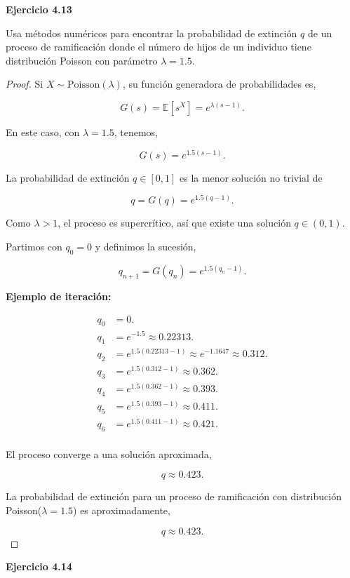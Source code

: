\documentclass{article}
\begin{document}
\textbf{Ejercicio 4.13}

Usa métodos numéricos para encontrar la probabilidad de extinción \( q \) de un proceso de ramificación donde el número de hijos de un individuo tiene distribución Poisson con parámetro \( \lambda = 1.5 \).

\begin{proof}
Si \( X \sim \text{Poisson}(\lambda) \), su función generadora de probabilidades es,

\[
G(s) = \mathbb{E}[s^X] = e^{\lambda(s - 1)}.
\]

En este caso, con \( \lambda = 1.5 \), tenemos,

\[
G(s) = e^{1.5(s - 1)}.
\]

La probabilidad de extinción \( q \in [0,1] \) es la menor solución no trivial de

\[
q = G(q) = e^{1.5(q - 1)}.
\]

Como \( \lambda > 1 \), el proceso es supercrítico, así que existe una solución \( q \in (0,1) \).

Partimos con \( q_0 = 0 \) y definimos la sucesión,

\[
q_{n+1} = G(q_n) = e^{1.5(q_n - 1)}.
\]

\textbf{Ejemplo de iteración:}

\[
\begin{aligned}
q_0 &= 0. \\
q_1 &= e^{-1.5} \approx 0.22313. \\
q_2 &= e^{1.5(0.22313 - 1)} \approx e^{-1.1647} \approx 0.312. \\ 
q_3 &= e^{1.5(0.312 - 1)} \approx 0.362. \\
q_4 &= e^{1.5(0.362 - 1)} \approx 0.393. \\
q_5 &= e^{1.5(0.393 - 1)} \approx 0.411. \\
q_6 &= e^{1.5(0.411 - 1)} \approx 0.421. \\
\end{aligned}
\]

El proceso converge a una solución aproximada,

\[
    q \approx 0.423.
\]

La probabilidad de extinción para un proceso de ramificación con distribución Poisson(\( \lambda = 1.5 \)) es aproximadamente,

\[
    q \approx 0.423.
\]
\end{proof}

\textbf{Ejercicio 4.14}
\end{document}
